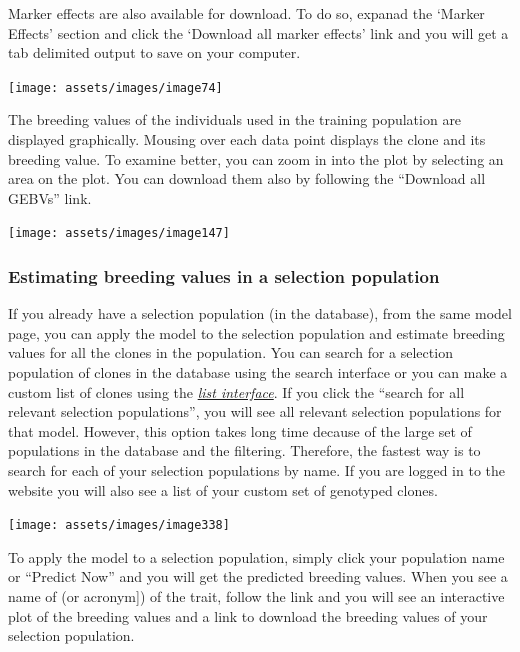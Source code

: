 \documentclass[
  12pt,
]{book}
\begin{document}
Marker effects are also available for download. To do so, expanad the `Marker Effects' section and click the `Download all marker effects' link and you will get a tab delimited output to save on your computer.

\begin{center}\texttt{[image: assets/images/image74]} \end{center}

The breeding values of the individuals used in the training population are displayed graphically. Mousing over each data point displays the clone and its breeding value. To examine better, you can zoom in into the plot by selecting an area on the plot. You can download them also by following the ``Download all GEBVs'' link.

\begin{center}\texttt{[image: assets/images/image147]} \end{center}

\hypertarget{estimating-breeding-values-in-a-selection-population}{%
\subsubsection*{Estimating breeding values in a selection population}\label{estimating-breeding-values-in-a-selection-population}}


If you already have a selection population (in the database), from the same model page, you can apply the model to the selection population and estimate breeding values for all the clones in the population. You can search for a selection population of clones in the database using the search interface or you can make a custom list of clones using the \protect\hyperlink{working-with-lists}{\emph{list interface}}. If you click the ``search for all relevant selection populations'', you will see all relevant selection populations for that model. However, this option takes long time decause of the large set of populations in the database and the filtering. Therefore, the fastest way is to search for each of your selection populations by name. If you are logged in to the website you will also see a list of your custom set of genotyped clones.

\begin{center}\texttt{[image: assets/images/image338]} \end{center}

To apply the model to a selection population, simply click your population name or ``Predict Now'' and you will get the predicted breeding values. When you see a name of (or acronym{]}) of the trait, follow the link and you will see an interactive plot of the breeding values and a link to download the breeding values of your selection population.
\end{document}

